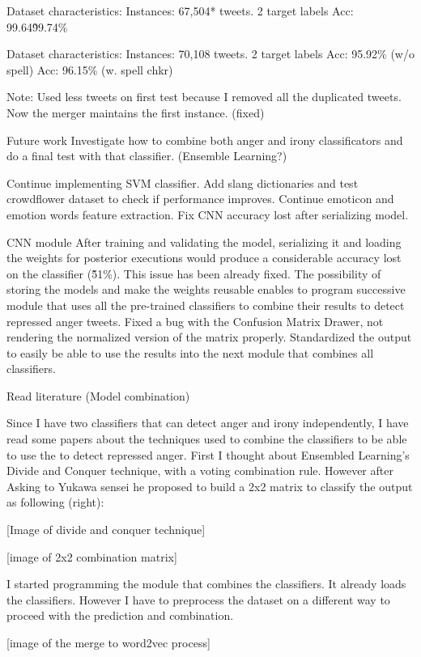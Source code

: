 Dataset characteristics:
Instances: 67,504* tweets.
2 target labels
Acc: 99.64\~99.74\%

Dataset characteristics:
Instances: 70,108 tweets.
2 target labels
Acc: 95.92\% (w/o spell)
Acc: 96.15\% (w. spell chkr)

Note: Used less tweets on first test because I removed all the duplicated tweets. Now the merger maintains the first instance. (fixed)

Future work
Investigate how to combine both anger and irony classificators and do a final test with that classifier. (Ensemble Learning?)

Continue implementing SVM classifier.
Add slang dictionaries and test crowdflower dataset to check if performance improves.
Continue emoticon and emotion words feature extraction.
Fix CNN accuracy lost after serializing model.

CNN module
After training and validating the model, serializing it and loading the weights for posterior executions would produce a considerable accuracy lost on the classifier (\~51\%). This issue has been already fixed. The possibility of storing the models and make the weights reusable enables to program successive module that uses all the pre-trained classifiers to combine their results to detect repressed anger tweets.
Fixed a bug with the Confusion Matrix Drawer, not rendering the normalized version of the matrix properly.
Standardized the output to easily be able to use the results into the next module that combines all classifiers.

Read literature (Model combination)

Since I have two classifiers that can detect anger and irony independently, I have read some papers about the techniques used to combine the classifiers to be able to use the to detect repressed anger. First I thought about Ensembled Learning’s Divide and Conquer technique, with a voting combination rule. However after Asking to Yukawa sensei he proposed to build a 2x2 matrix to classify the output as following (right):

[Image of divide and conquer technique]

[image of 2x2 combination matrix]

I started programming the module that combines the classifiers. It already loads the classifiers. However I have to preprocess the dataset on a different way to proceed with the prediction and combination.

[image of the merge to word2vec process]


